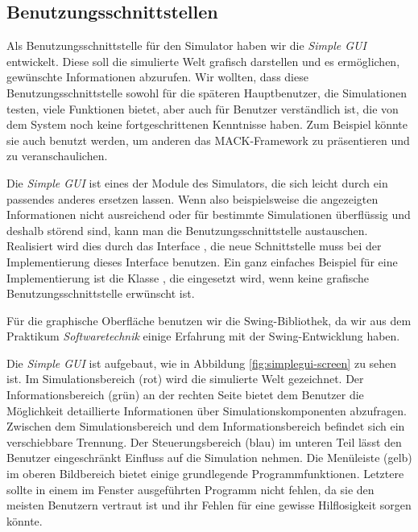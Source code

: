\subsection{Benutzungsschnittstellen}\label{subsec:real_interfaces}

Als Benutzungsschnittstelle für den Simulator haben wir die \emph{Simple GUI} entwickelt. Diese soll die simulierte Welt grafisch darstellen und es ermöglichen, gewünschte Informationen abzurufen. Wir wollten, dass diese Benutzungsschnittstelle sowohl für die späteren Hauptbenutzer, die Simulationen testen, viele Funktionen bietet, aber auch für Benutzer verständlich ist, die von dem System noch keine fortgeschrittenen Kenntnisse haben. Zum Beispiel könnte sie auch benutzt werden, um anderen das MACK-Framework zu präsentieren und zu veranschaulichen.

Die \emph{Simple GUI} ist eines der Module des Simulators, die sich leicht durch ein passendes anderes ersetzen lassen. Wenn also beispielsweise die angezeigten Informationen nicht ausreichend oder für bestimmte Simulationen überflüssig und deshalb störend sind, kann man die Benutzungsschnittstelle austauschen. Realisiert wird dies durch das Interface , die neue Schnittstelle muss bei der Implementierung dieses Interface benutzen. Ein ganz einfaches Beispiel für eine Implementierung ist die Klasse , die eingesetzt wird, wenn keine grafische Benutzungsschnittstelle erwünscht ist.

Für die graphische Oberfläche benutzen wir die Swing-Bibliothek, da wir aus dem Praktikum \emph{Softwaretechnik} einige Erfahrung mit der Swing-Entwicklung haben.

Die \emph{Simple GUI} ist aufgebaut, wie in Abbildung \ref{fig:simplegui-screen} zu sehen ist. Im Simulationsbereich (rot) wird die simulierte Welt gezeichnet. Der Informationsbereich (grün) an der rechten Seite bietet dem Benutzer die Möglichkeit detaillierte Informationen über Simulationskomponenten abzufragen. Zwischen dem Simulationsbereich und dem Informationsbereich befindet sich ein verschiebbare Trennung. Der Steuerungsbereich (blau) im unteren Teil lässt den Benutzer eingeschränkt Einfluss auf die Simulation nehmen. Die Menüleiste (gelb) im oberen Bildbereich bietet einige grundlegende Programmfunktionen. Letztere sollte in einem im Fenster ausgeführten Programm nicht fehlen, da sie den meisten Benutzern vertraut ist und ihr Fehlen für eine gewisse Hilflosigkeit sorgen könnte. 

